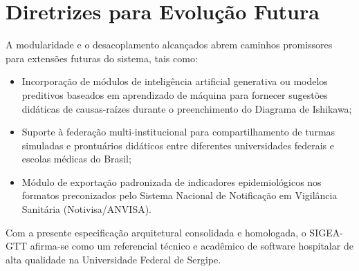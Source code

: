 \section{Diretrizes para Evolução Futura}
\label{sec_diretrizes_evolucao}

A modularidade e o desacoplamento alcançados abrem caminhos promissores para extensões futuras do sistema, tais como:
\begin{itemize}
    \item Incorporação de módulos de inteligência artificial generativa ou modelos preditivos baseados em aprendizado de máquina para fornecer sugestões didáticas de causas-raízes durante o preenchimento do Diagrama de Ishikawa;
    \item Suporte à federação multi-institucional para compartilhamento de turmas simuladas e prontuários didáticos entre diferentes universidades federais e escolas médicas do Brasil;
    \item Módulo de exportação padronizada de indicadores epidemiológicos nos formatos preconizados pelo Sistema Nacional de Notificação em Vigilância Sanitária (Notivisa/ANVISA).
\end{itemize}

Com a presente especificação arquitetural consolidada e homologada, o SIGEA-GTT afirma-se como um referencial técnico e acadêmico de software hospitalar de alta qualidade na Universidade Federal de Sergipe.
